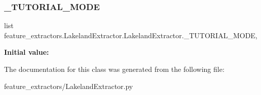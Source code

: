 \subsubsection{\texorpdfstring{\_TUTORIAL\_MODE}{\_TUTORIAL\_MODE}}
{\footnotesize\ttfamily list feature\+\_\+extractors.\+Lakeland\+Extractor.\+Lakeland\+Extractor.\+\_\+\+T\+U\+T\+O\+R\+I\+A\+L\+\_\+\+M\+O\+DE\hspace{0.3cm}{\ttfamily [static]}, {\ttfamily [private]}}

{\bfseries Initial value\+:}
\begin{DoxyCode}{0}
\DoxyCodeLine{=  [}
\DoxyCodeLine{        \textcolor{stringliteral}{"build\_a\_house"},}
\DoxyCodeLine{        \textcolor{stringliteral}{"buy\_food"},}
\DoxyCodeLine{        \textcolor{stringliteral}{"build\_a\_farm"},}
\DoxyCodeLine{        \textcolor{stringliteral}{"timewarp"},}
\DoxyCodeLine{        \textcolor{stringliteral}{"sell\_food"},}
\DoxyCodeLine{        \textcolor{stringliteral}{"buy\_fertilizer"},}
\DoxyCodeLine{        \textcolor{stringliteral}{"buy\_livestock"},}
\DoxyCodeLine{    ]}

\end{DoxyCode}


The documentation for this class was generated from the following file\+:\begin{DoxyCompactItemize}
\item 
feature\+\_\+extractors/Lakeland\+Extractor.\+py\end{DoxyCompactItemize}
